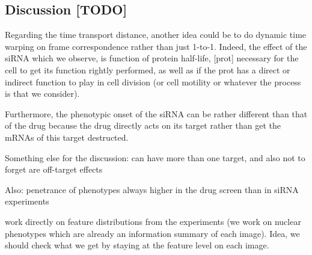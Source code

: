 
\subsection{Discussion [TODO]}
Regarding the time transport distance, another idea could be to do dynamic time warping on frame correspondence rather than just 1-to-1. Indeed, the effect of the siRNA which we observe, is function of protein half-life, [prot] necessary for the cell to get its function rightly performed, as well as  if the prot has a direct or indirect function to play in cell division (or cell motility or whatever the process is that we consider).

Furthermore, the phenotypic onset of the siRNA can be rather different than that of the drug because the drug directly acts on its target rather than get the mRNAs of this target destructed.

Something else for the discussion: can have more than one target, and also not to forget are off-target effects

Also: penetrance of phenotypes always higher in the drug screen than in siRNA experiments

\cite{pmid18066055} work directly on feature distributions from the experiments (we work on nuclear phenotypes which are already an information summary of each image). Idea, we should check what we get by staying at the feature level on each image.
